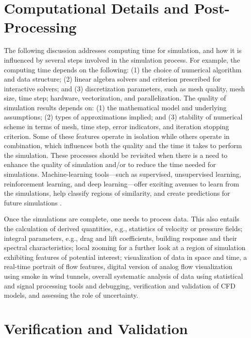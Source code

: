 \section{Computational Details and Post-Processing}
\label{sec:resp_cfd_wind_flow_postproc}

The following discussion addresses computing time for simulation, and how it is influenced by several steps involved in the simulation process. For example, the computing time depends on the following: (1) the choice of numerical algorithm and data structure; (2) linear algebra solvers and criterion prescribed for interactive solvers; and (3) discretization parameters, such as mesh quality, mesh size, time step; hardware, vectorization, and parallelization. The quality of simulation results depends on: (1) the mathematical model and underlying assumptions; (2) types of approximations implied; and (3) stability of numerical scheme in terms of mesh, time step, error indicators, and iteration stopping criterion. Some of these features operate in isolation while others operate in combination, which influences both the quality and the time it takes to perform the simulation. These processes should be revisited when there is a need to enhance the quality of simulation and/or to reduce the time needed for simulations. Machine-learning tools---such as supervised, unsupervised learning, reinforcement learning, and deep learning---offer exciting avenues to learn from the simulations, help classify regions of similarity, and create predictions for future simulations \citep{kareem2019generalized}.

Once the simulations are complete, one needs to process data. This also entails the calculation of derived quantities, e.g., statistics of velocity or pressure fields; integral parameters, e.g., drag and lift coefficients, building response and their spectral characteristics; local zooming for a further look at a region of simulation exhibiting features of potential interest; visualization of data in space and time, a real-time portrait of flow features, digital version of analog flow visualization using smoke in wind tunnels, overall systematic analysis of data using statistical and signal processing tools and debugging, verification and validation of CFD models, and assessing the role of uncertainty.

\section{Verification and Validation}
\label{sec:resp_cfd_wind_flow_validation}

